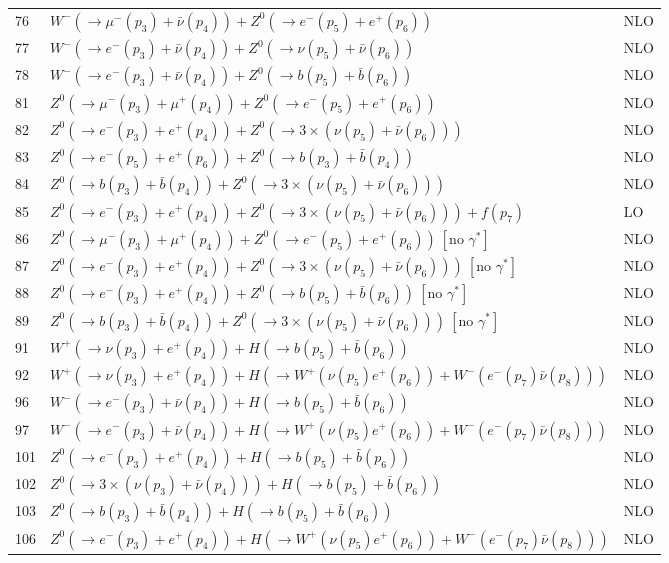 \documentclass[12pt]{article}
\begin{document}
\begin{itemize}
\begin{table}
\begin{center}
\begin{tabular}{|l|l|l|}
\hline 
76& $ W^-(\to \mu^-(p_3)+\bar{\nu}(p_4))+Z^0(\to e^-(p_5)+e^+(p_6)) $ & NLO \\
77& $ W^-(\to e^-(p_3)+\bar{\nu}(p_4))+Z^0(\to \nu(p_5)+\bar{\nu}(p_6)) $ & NLO \\
78& $ W^-(\to e^-(p_3)+\bar{\nu}(p_4))+Z^0(\to b(p_5)+\bar{b}(p_6)) $ & NLO \\
\hline 
81& $ Z^0(\to \mu^-(p_3)+\mu^+(p_4)) + Z^0(\to e^-(p_5)+e^+(p_6)) $ & NLO \\
82& $ Z^0(\to e^-(p_3)+e^+(p_4)) + Z^0(\to 3\times(\nu(p_5)+\bar{\nu}(p_6)))$ & NLO \\
83& $ Z^0(\to e^-(p_5)+e^+(p_6)) + Z^0(\to b(p_3)+\bar{b}(p_4)) $ & NLO \\
84& $ Z^0(\to b(p_3)+\bar{b}(p_4)) + Z^0(\to 3\times(\nu(p_5)+\bar{\nu}(p_6)))$ & NLO \\
85& $ Z^0(\to e^-(p_3)+e^+(p_4)) + Z^0(\to 3\times(\nu(p_5)+\bar{\nu}(p_6))) + f(p_7)$ & LO \\
\hline 
86& $ Z^0(\to \mu^-(p_3)+\mu^+(p_4)) + Z^0(\to e^-(p_5)+e^+(p_6))~[ \mbox{no $\gamma^*$} ] $ & NLO \\
87& $ Z^0(\to e^-(p_3)+e^+(p_4))+Z^0(\to 3\times(\nu(p_5)+\bar{\nu}(p_6))) ~[ \mbox{no $\gamma^*$} ] $ & NLO \\
88& $ Z^0(\to e^-(p_3)+e^+(p_4))+Z^0(\to b(p_5)+\bar{b}(p_6)) ~[ \mbox{no $\gamma^*$} ] $ & NLO \\
89& $ Z^0(\to b(p_3)+\bar{b}(p_4))+Z^0(\to 3\times(\nu(p_5)+\bar{\nu}(p_6)))~[ \mbox{no $\gamma^*$} ] $ & NLO \\
\hline 
91& $ W^+(\to \nu(p_3)+e^+(p_4)) + H(\to b(p_5)+\bar{b}(p_6))  $ & NLO \\
92& $ W^+(\to \nu(p_3)+e^+(p_4)) + H(\to W^+(\nu(p_5) e^+(p_6)) + W^-(e^-(p_7) \bar{\nu}(p_8)))  $ & NLO \\
96& $ W^-(\to e^-(p_3)+\bar{\nu}(p_4)) + H(\to b(p_5)+\bar{b}(p_6)) $ & NLO \\ 
97& $ W^-(\to e^-(p_3)+\bar{\nu}(p_4)) + H(\to W^+(\nu(p_5) e^+(p_6)) + W^-(e^-(p_7) \bar{\nu}(p_8)))  $ & NLO \\
\hline 
101& $ Z^0(\to e^-(p_3)+e^+(p_4)) + H(\to b(p_5)+\bar{b}(p_6)) $ & NLO \\
102& $ Z^0(\to 3\times(\nu(p_3)+\bar{\nu}(p_4))) + H(\to b(p_5)+\bar{b}(p_6)) $ & NLO \\
103& $ Z^0(\to b(p_3)+\bar{b}(p_4)) + H(\to b(p_5)+\bar{b}(p_6)) $ & NLO \\     
106& $ Z^0(\to e^-(p_3)+e^+(p_4)) + H(\to W^+(\nu(p_5) e^+(p_6)) + W^-(e^-(p_7) \bar{\nu}(p_8))) $ & NLO \\

\end{tabular}
\end{center}
\end{table}
\end{itemize}
\end{document}
